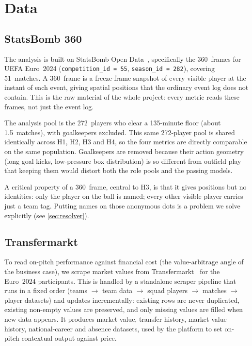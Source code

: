 \documentclass[12pt,a4paper]{article}
\begin{document}
\clearpage
\section{Data}\label{sec:data}

\subsection{StatsBomb 360}\label{sec:statsbomb}

The analysis is built on StatsBomb Open Data~\cite{statsbomb}, specifically the 360~frames for UEFA Euro~2024 (\texttt{competition\_id\,=\,55}, \texttt{season\_id\,=\,282}), covering 51~matches.
A 360~frame is a freeze-frame snapshot of every visible player at the instant of each event, giving spatial positions that the ordinary event log does not contain.
This is the raw material of the whole project: every metric reads these frames, not just the event log.

The analysis pool is the 272~players who clear a 135-minute floor (about 1.5~matches), with goalkeepers excluded.
This same 272-player pool is shared identically across H1, H2, H3 and H4, so the four metrics are directly comparable on the same population.
Goalkeepers are removed because their action geometry (long goal kicks, low-pressure box distribution) is so different from outfield play that keeping them would distort both the role pools and the passing models.

A critical property of a 360~frame, central to H3, is that it gives positions but no identities: only the player on the ball is named; every other visible player carries just a team tag.
Putting names on those anonymous dots is a problem we solve explicitly (see \cref{sec:resolver}).

\subsection{Transfermarkt}\label{sec:transfermarkt}

To read on-pitch performance against financial cost (the value-arbitrage angle of the business case), we scrape market values from Transfermarkt~\cite{transfermarkt} for the Euro~2024 participants.
This is handled by a standalone scraper pipeline that runs in a fixed order (teams $\to$ team data $\to$ squad players $\to$ matches $\to$ player datasets) and updates incrementally: existing rows are never duplicated, existing non-empty values are preserved, and only missing values are filled when new data appears.
It produces market value, transfer history, market-value history, national-career and absence datasets, used by the platform to set on-pitch contextual output against price.
\end{document}
